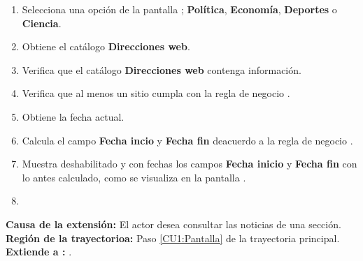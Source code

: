 \begin{enumerate}[1.]
	
	\item \actor Selecciona una opción de la pantalla ; \textbf{Política}, \textbf{Economía}, \textbf{Deportes} o \textbf{Ciencia}. 
	
	\item \sistema Obtiene el catálogo \textbf{Direcciones web}.
	
	\item \sistema Verifica que el catálogo \textbf{Direcciones web} contenga información. 
	
	\item \sistema Verifica que al menos un sitio cumpla con la regla de negocio . 

	\item \sistema Obtiene la fecha actual.

	\item \sistema \label{CU1:FechaI}Calcula el campo \textbf{Fecha incio} y \textbf{Fecha fin} deacuerdo a la regla de negocio .

	\item \label{CU1:Pantalla}\sistema Muestra deshabilitado y con fechas los campos \textbf{Fecha inicio} y \textbf{Fecha fin} con lo antes calculado, como se visualiza en la pantalla .
	
	\item \finCU	

\end{enumerate}






\textbf{Causa de la extensión:} El actor desea consultar las noticias de una sección.\\
\textbf{Región de la trayectorioa:} Paso \ref{CU1:Pantalla} de la trayectoria principal.\\
\textbf{Extiende a :} .\\\\



